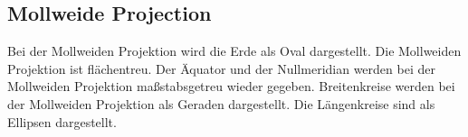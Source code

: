 \subsection{Mollweide Projection}
\label{sec:Mollweiden}
Bei der Mollweiden Projektion wird die Erde als Oval dargestellt. Die Mollweiden Projektion ist flächentreu.
Der Äquator und der Nullmeridian werden bei der Mollweiden Projektion maßstabsgetreu wieder gegeben.
Breitenkreise werden bei der Mollweiden Projektion als Geraden dargestellt. Die Längenkreise sind als Ellipsen dargestellt.
